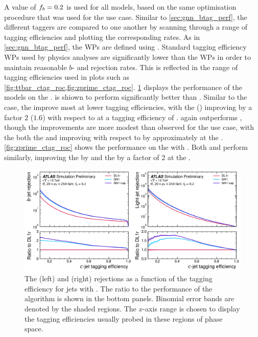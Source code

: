 A value of $f_b = 0.2$ is used for all models, based on the same optimisation procedure that was used for the \btag use case.
Similar to \cref{sec:gnn_btag_perf}, the different taggers are compared to one another by scanning through a range of \cjet tagging efficiencies and plotting the corresponding \blrej rates.
As in \cref{sec:gnn_btag_perf}, the WPs are defined using \ttbarjets.
Standard \cjet tagging efficiency WPs used by physics analyses are significantly lower than the \btag WPs in order to maintain reasonable $b$- and \ljet rejection rates.
This is reflected in the range of \cjet tagging efficiencies used in \ctag plots such as \cref{fig:ttbar_ctag_roc,fig:zprime_ctag_roc}.
\cref{fig:ttbar_ctag_roc} displays the \ctag performance of the models on the \ttbarjets.
\GNN is shiown to perform significantly better than \DLr.
Similar to the \btag case, the \blrej improve most at lower \cjet tagging efficiencies, with the \crej (\lrej) improving by a factor $2$ ($1.6$) with respect to \DLr at a \cjet tagging efficiency of .
\GNNLep again outperforms \GNN, though the improvements are more modest than observed for the \btag use case, with the both the \brej and \lrej improving with respect to \GNN by approximately  at the .
\cref{fig:zprime_ctag_roc} shows the \ctag performance on the \Zprimejets with \Zprimept.
Both \GNN and \GNNLep perform similarly, improving the \brej by  and the \lrej by a factor of 2 at the .

\begin{figure}[!p]
    \centering
    \includegraphics[width=\textwidth]{chapters/gnn_tagger/figs/results/main/ttbar/ttbar_roc_ctag.pdf}
    \caption{
        The \bjet (left) and \ljet (right) rejections as a function of the \cjet tagging efficiency for \ttbar jets with \ttbarpt \cite{ATL-PHYS-PUB-2022-027}.
        The ratio to the performance of the \DLr algorithm is shown in the bottom panels.
        Binomial error bands are denoted by the shaded regions.
        The $x$-axis range is chosen to display the \cjet tagging efficiencies usually probed in these regions of phase space.
    }
    \label{fig:ttbar_ctag_roc}
\end{figure}

